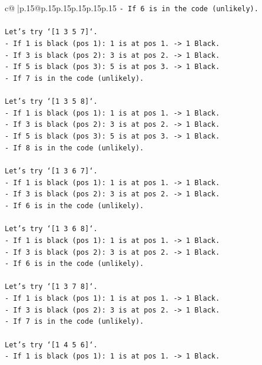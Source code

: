 \documentclass{article}
\begin{document}
{\begin{supertabular}{c@{$\;$}|p{.15\linewidth}@{}p{.15\linewidth}p{.15\linewidth}p{.15\linewidth}p{.15\linewidth}p{.15\linewidth}}
{{{\texttt{{-} If 6 is in the code (unlikely).} \\
\\ 
\texttt{Let's try `{[}1 3 5 7{]}`.} \\
\texttt{{-} If 1 is black (pos 1): 1 is at pos 1. {-}> 1 Black.} \\
\texttt{{-} If 3 is black (pos 2): 3 is at pos 2. {-}> 1 Black.} \\
\texttt{{-} If 5 is black (pos 3): 5 is at pos 3. {-}> 1 Black.} \\
\texttt{{-} If 7 is in the code (unlikely).} \\
\\ 
\texttt{Let's try `{[}1 3 5 8{]}`.} \\
\texttt{{-} If 1 is black (pos 1): 1 is at pos 1. {-}> 1 Black.} \\
\texttt{{-} If 3 is black (pos 2): 3 is at pos 2. {-}> 1 Black.} \\
\texttt{{-} If 5 is black (pos 3): 5 is at pos 3. {-}> 1 Black.} \\
\texttt{{-} If 8 is in the code (unlikely).} \\
\\ 
\texttt{Let's try `{[}1 3 6 7{]}`.} \\
\texttt{{-} If 1 is black (pos 1): 1 is at pos 1. {-}> 1 Black.} \\
\texttt{{-} If 3 is black (pos 2): 3 is at pos 2. {-}> 1 Black.} \\
\texttt{{-} If 6 is in the code (unlikely).} \\
\\ 
\texttt{Let's try `{[}1 3 6 8{]}`.} \\
\texttt{{-} If 1 is black (pos 1): 1 is at pos 1. {-}> 1 Black.} \\
\texttt{{-} If 3 is black (pos 2): 3 is at pos 2. {-}> 1 Black.} \\
\texttt{{-} If 6 is in the code (unlikely).} \\
\\ 
\texttt{Let's try `{[}1 3 7 8{]}`.} \\
\texttt{{-} If 1 is black (pos 1): 1 is at pos 1. {-}> 1 Black.} \\
\texttt{{-} If 3 is black (pos 2): 3 is at pos 2. {-}> 1 Black.} \\
\texttt{{-} If 7 is in the code (unlikely).} \\
\\ 
\texttt{Let's try `{[}1 4 5 6{]}`.} \\
\texttt{{-} If 1 is black (pos 1): 1 is at pos 1. {-}> 1 Black.} \\
}}}
\end{supertabular}}
\end{document}
